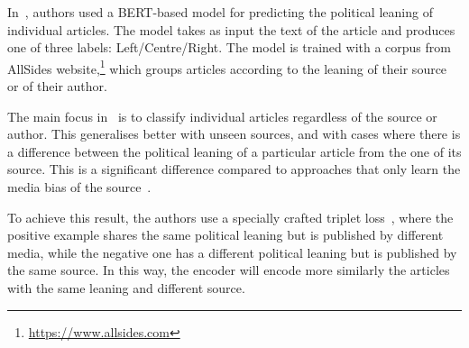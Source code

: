  

In~\citet{baly2020we}, authors used a BERT-based model for predicting the political leaning of individual articles. The model takes as input the text of the article and produces one of three labels: Left/Centre/Right. The model is trained with a corpus from AllSides website,\footnote{\url{https://www.allsides.com}} which groups articles %
according to the leaning of their source or of their author.


The main focus in~\citet{baly2020we} is to classify individual articles regardless of the source or author. This generalises better with unseen sources, and with cases where there is a difference between the political leaning of a particular article from the one of its source.
This is a significant difference compared to approaches that only learn the media bias of the source~\citep{baly2020written,biessmann2016automating}.

To achieve this result, the authors use a specially crafted triplet loss~\citep{schroff2015facenet}, where the positive example shares the same political leaning but is published by different media, while the negative one has a different political leaning but is published by the same source. In this way, the encoder will encode more similarly the articles with the same leaning and different source.

